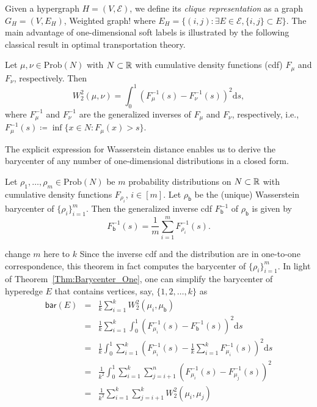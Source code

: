 \documentclass[letterpaper]{article} %
\begin{document}
Given a hypergraph $H=(V, \mathcal E)$, we define its \textit{clique representation} as a graph $G_H=(V, E_H)$, {\color{blue}Weighted graph!} where $E_H=\{(i, j):\exists E\in \mathcal E, \{i, j\}\subset E\}$. The main advantage of one-dimensional soft labels is illustrated by the following classical result in optimal transportation theory.
\begin{theorem}\cite{villani2003topics}\label{Thm:Wasserstein_One}
Let $\mu, \nu\in \mathrm{Prob}(N)$ with $N\subset\mathbb{R}$ with cumulative density functions (cdf) $F_\mu$ and $F_\nu$, respectively. Then $$W_2^2(\mu, \nu)=\int_{0}^1\left(F_\mu^{-1}(s)-F_\nu^{-1}(s)\right)^2\text{d}s,$$
where $F_{\mu}^{-1}$ and $F_{\nu}^{-1}$ are the generalized inverses of $F_\mu$ and $F_\nu$, respectively, i.e., $F_\mu^{-1}(s)\coloneqq \inf\{x\in N:F_\mu(x)>s\}$. 
\end{theorem}
The explicit expression for Wasserstein distance enables us to derive the barycenter of any number of one-dimensional distributions in a closed form. 
\begin{theorem}\cite{bigot2017}
\label{Thm:Barycenter_One}
Let $\rho_1, \dots, \rho_m\in \mathrm{Prob}(N)$ be $m$ probability distributions on $N\subset\mathbb{R}$ with cumulative density functions $F_{\rho_i}$, $i\in [m]$. Let $\rho_{\mathsf{b}}$ be the (unique) Wasserstein barycenter of $\{\rho_i\}_{i=1}^m$. Then the generalized inverse cdf $F^{-1}_{\mathsf{b}}$ of $\rho_{\mathsf{b}}$ is given by 
$$F^{-1}_{\mathsf{b}}(s)=\frac{1}{m}\sum_{i=1}^mF_{\rho_i}^{-1}(s).$$
\end{theorem}
{\color{blue} change $m$ here to $k$}
Since the inverse cdf and the distribution are in one-to-one correspondence, this theorem in fact computes the barycenter of $\{\rho_i\}_{i=1}^m$. In light of Theorem~\ref{Thm:Barycenter_One}, one can simplify the barycenter of hyperedge $E$ that contains vertices, say, $\{1, 2, \dots, k\}$ as 
\begin{eqnarray}
\mathsf{bar}(E) &=& \frac{1}{k}\sum_{i=1}^kW^2_2(\mu_i, \mu_\mathsf{b})\nonumber\\
&=&\frac{1}{k}\sum_{i=1}^k\int_{0}^1\left(F_{\mu_i}^{-1}(s)-F_\mathsf{b}^{-1}(s)\right)^2\text{d}s\nonumber\\
&=&\frac{1}{k}\int_{0}^{1}\sum_{i=1}^k\left(F_{\mu_i}^{-1}(s)-\frac{1}{k}\sum_{i=1}^kF_{\mu_i}^{-1}(s)\right)^2\text{d}s\nonumber\\
&=&\frac{1}{k^2}\int_0^1\sum_{i=1}^k\sum_{j=i+1}^n\left(F_{\mu_i}^{-1}(s)-F_{\mu_j}^{-1}(s)\right)^2 \nonumber\\
&=&\frac{1}{k^2}\sum_{i=1}^k\sum_{j=i+1}^kW_2^2(\mu_i, \mu_j)\label{Eq:One_D_Equivalence}
\end{eqnarray}
\end{document}

